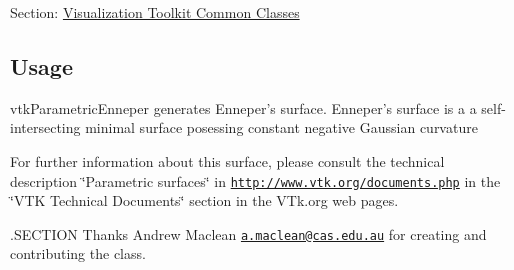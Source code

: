 Section\-: \hyperlink{sec_vtkcommon}{Visualization Toolkit Common Classes} \hypertarget{vtkwidgets_vtkxyplotwidget_Usage}{}\subsection{Usage}\label{vtkwidgets_vtkxyplotwidget_Usage}
vtk\-Parametric\-Enneper generates Enneper's surface. Enneper's surface is a a self-\/intersecting minimal surface posessing constant negative Gaussian curvature

For further information about this surface, please consult the technical description \char`\"{}\-Parametric surfaces\char`\"{} in \href{http://www.vtk.org/documents.php}{\tt http\-://www.\-vtk.\-org/documents.\-php} in the \char`\"{}\-V\-T\-K Technical Documents\char`\"{} section in the V\-Tk.\-org web pages.

.S\-E\-C\-T\-I\-O\-N Thanks Andrew Maclean \href{mailto:a.maclean@cas.edu.au}{\tt a.\-maclean@cas.\-edu.\-au} for creating and contributing the class.

